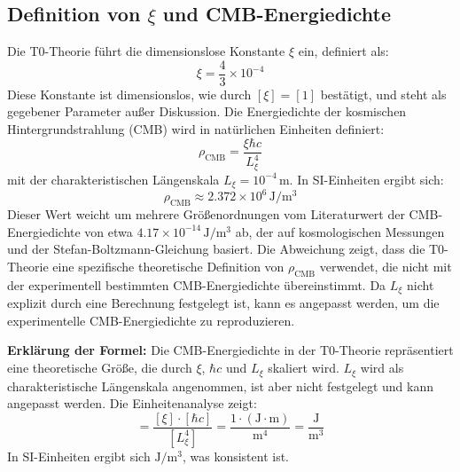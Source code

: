 \documentclass{article}
\begin{document}
	\subsection{Definition von $\xi$ und CMB-Energiedichte}
	Die T0-Theorie führt die dimensionslose Konstante $\xi$ ein, definiert als:
	\begin{equation}
		\xi = \frac{4}{3} \times 10^{-4}
	\end{equation}
	Diese Konstante ist dimensionslos, wie durch $[ \xi ] = [1]$ bestätigt, und steht als gegebener Parameter außer Diskussion. Die Energiedichte der kosmischen Hintergrundstrahlung (CMB) wird in natürlichen Einheiten definiert:
	\begin{equation}
		\rho_{\text{CMB}} = \frac{\xi \hbar c}{L_\xi^4}
	\end{equation}
	mit der charakteristischen Längenskala $L_\xi = 10^{-4} \, \text{m}$. In SI-Einheiten ergibt sich:
	\begin{equation}
		\rho_{\text{CMB}} \approx 2.372 \times 10^6 \, \text{J}/\text{m}^3
	\end{equation}
	Dieser Wert weicht um mehrere Größenordnungen vom Literaturwert der CMB-Energiedichte von etwa $4.17 \times 10^{-14} \, \text{J}/\text{m}^3$ ab, der auf kosmologischen Messungen und der Stefan-Boltzmann-Gleichung basiert. Die Abweichung zeigt, dass die T0-Theorie eine spezifische theoretische Definition von $\rho_{\text{CMB}}$ verwendet, die nicht mit der experimentell bestimmten CMB-Energiedichte übereinstimmt. Da $L_\xi$ nicht explizit durch eine Berechnung festgelegt ist, kann es angepasst werden, um die experimentelle CMB-Energiedichte zu reproduzieren.
	
	\textbf{Erklärung der Formel:} Die CMB-Energiedichte in der T0-Theorie repräsentiert eine theoretische Größe, die durch $\xi$, $\hbar c$ und $L_\xi$ skaliert wird. $L_\xi$ wird als charakteristische Längenskala angenommen, ist aber nicht festgelegt und kann angepasst werden. Die Einheitenanalyse zeigt:
	\begin{equation}
		[\rho_{\text{CMB}}] = \frac{[\xi] \cdot [\hbar c]}{[L_\xi^4]} = \frac{1 \cdot (\text{J} \cdot \text{m})}{\text{m}^4} = \frac{\text{J}}{\text{m}^3}
	\end{equation}
	In SI-Einheiten ergibt sich $\text{J}/\text{m}^3$, was konsistent ist.
	
\end{document}
